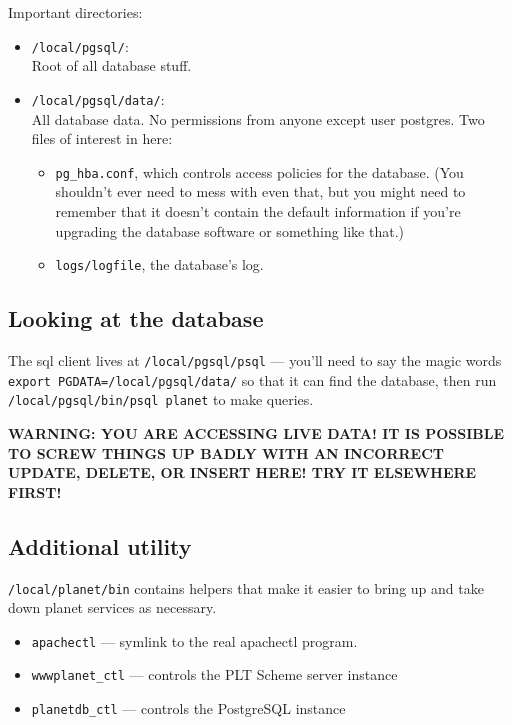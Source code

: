 \documentclass{article}
\begin{document}
Important directories: 
\begin{itemize}
\item \texttt{/local/pgsql/}: \\
Root of all database stuff.

\item \texttt{/local/pgsql/data/}: \\
All database data. No permissions from anyone
except user postgres. Two files of interest in here:
\begin{itemize}
  \item \texttt{pg\_hba.conf}, which controls access policies for
  the database. (You shouldn't ever need to mess with even that, but
  you might need to remember that it doesn't contain the default
  information if you're upgrading the database software or something
  like that.)
  \item \texttt{logs/logfile}, the database's log. 
\end{itemize}
\end{itemize}

\subsection{Looking at the database}

The sql client lives at \texttt{/local/pgsql/psql} --- you'll need to
say the magic words \texttt{export PGDATA=/local/pgsql/data/}
so that it can find the database, then run
  \texttt{/local/pgsql/bin/psql planet}
to make queries. 

\textbf{WARNING: YOU ARE ACCESSING LIVE DATA! IT IS POSSIBLE
TO SCREW THINGS UP BADLY WITH AN INCORRECT UPDATE, DELETE, OR INSERT
HERE! TRY IT ELSEWHERE FIRST!}

\subsection{Additional utility}

\texttt{/local/planet/bin} contains helpers that make it easier to bring up
and take down planet services as necessary.

\begin{itemize}
\item \texttt{apachectl} --- symlink to the real apachectl program. 
\item \texttt{wwwplanet\_ctl} --- controls the PLT Scheme server instance
\item \texttt{planetdb\_ctl} --- controls the PostgreSQL instance
\end{itemize}
\end{document}
